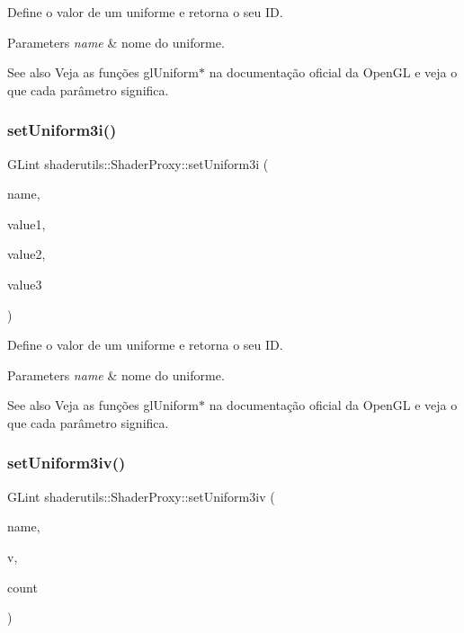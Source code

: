 Define o valor de um uniforme e retorna o seu ID. 
\begin{DoxyParams}{Parameters}
{\em name} & nome do uniforme. \\
\hline
\end{DoxyParams}
\begin{DoxySeeAlso}{See also}
Veja as funções gl\+Uniform$\ast$ na documentação oficial da Open\+GL e veja o que cada parâmetro significa. 
\end{DoxySeeAlso}
\mbox{\label{classshaderutils_1_1_shader_proxy_a7464ee4640993975ec29189337364215}} 
\subsubsection{\texorpdfstring{set\+Uniform3i()}{setUniform3i()}}
{\footnotesize\ttfamily G\+Lint shaderutils\+::\+Shader\+Proxy\+::set\+Uniform3i (\begin{DoxyParamCaption}\item[{const char $\ast$}]{name,  }\item[{G\+Lint}]{value1,  }\item[{G\+Lint}]{value2,  }\item[{G\+Lint}]{value3 }\end{DoxyParamCaption})\hspace{0.3cm}{\ttfamily [inline]}}

Define o valor de um uniforme e retorna o seu ID. 
\begin{DoxyParams}{Parameters}
{\em name} & nome do uniforme. \\
\hline
\end{DoxyParams}
\begin{DoxySeeAlso}{See also}
Veja as funções gl\+Uniform$\ast$ na documentação oficial da Open\+GL e veja o que cada parâmetro significa. 
\end{DoxySeeAlso}
\mbox{\label{classshaderutils_1_1_shader_proxy_a98c77d6389dbbd701c73b9c63fbd53d2}} 
\subsubsection{\texorpdfstring{set\+Uniform3iv()}{setUniform3iv()}}
{\footnotesize\ttfamily G\+Lint shaderutils\+::\+Shader\+Proxy\+::set\+Uniform3iv (\begin{DoxyParamCaption}\item[{const char $\ast$}]{name,  }\item[{const G\+Lint $\ast$}]{v,  }\item[{G\+Luint}]{count }\end{DoxyParamCaption})\hspace{0.3cm}{\ttfamily [inline]}}

